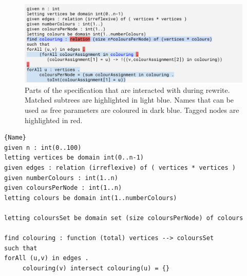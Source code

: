 \documentclass[a4paper,UKenglish,cleveref,pdfa]{lipics-v2021}
\newcommand{\zap}[1]{}
\begin{document}
\begin{figure}[ht]
    \centering
    \includegraphics[width=\columnwidth]{CP2024-midrewrite.pdf}
    \caption{Parts of the specification that are interacted with during rewrite. Matched subtrees are highlighted in light blue. Names that can be used as free parameters are coloured in dark blue. Tagged nodes are highlighted in red.}
\end{figure}

\zap{
\begin{lstlisting}[caption={Matching during rewriting},label={lst:during},frame=tlrb,style=plain,classoffset=0,morekeywords={colouring},keywordstyle=\color{blue},classoffset=1,morekeywords={sum},keywordstyle=\color{red}]{Name}
given n : int
letting vertices be domain int(0..n-1)
given edges : relation (irreflexive) of ( vertices * vertices )
given numberColours : int(1..)
given coloursPerNode : int(1..)
letting colours be domain int(1..numberColours)
find colouring : relation (size n*coloursPerNode) of (vertices * colours)
such that

forAll (u,v) in edges .
     (forAll colourAssignment in colouring .
        (colourAssignment[1] = u) -> !((v,colourAssignment[2]) in colouring)),

forAll u : vertices .
     coloursPerNode = (sum colourAssignment in colouring .
        toInt(colourAssignment[1] = u))
\end{lstlisting}
}

\zap{
\noindent\texttt{\footnotesize%
given n : int\\
letting vertices be {\color{red}domain int(0..n-1)}\\
given edges : relation (irreflexive) of ( vertices * vertices )
}
}

\begin{lstlisting}[caption=Rewritten specification.,label={lst:after},frame=tlrb]{Name}
given n : int(0..100)
letting vertices be domain int(0..n-1)
given edges : relation (irreflexive) of ( vertices * vertices )
given numberColours : int(1..n)
given coloursPerNode : int(1..n)
letting colours be domain int(1..numberColours)

letting coloursSet be domain set (size coloursPerNode) of colours

find colouring : function (total) vertices --> coloursSet
such that
forAll (u,v) in edges .
     colouring(v) intersect colouring(u) = {}
\end{lstlisting}
\end{document}

